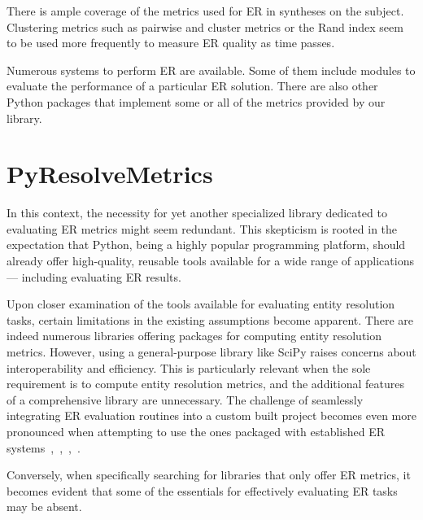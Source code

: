 \documentclass[a4paper,twoside]{article}
\begin{document}
    There is ample coverage of the metrics used for ER in syntheses on the
    subject\cite{vldb2010,hitesh2012,Tal11}.
    Clustering metrics such as pairwise and cluster metrics\cite{Men10, huang2006efficient}
    or the Rand index\cite{tal2007algebraic} seem to be used more frequently to
    measure ER quality as time passes.

    Numerous systems to perform ER are available.
    Some of them include modules to evaluate the performance of a
    particular ER solution\cite{fever2009,magellan2020,oyster2012}.
    There are also other Python packages that implement some or all of the
    metrics provided by our library\cite{nmeth2020scipy,ereval}.

    \section{PyResolveMetrics}\label{sec:library}

    In this context, the necessity for yet another specialized library dedicated
    to evaluating ER metrics might seem redundant.
    This skepticism is rooted in the expectation that Python, being a highly
    popular programming platform, should already offer high-quality, reusable
    tools available for a wide range of applications --- including evaluating
    ER results.
    
    Upon closer examination of the tools available for evaluating entity
    resolution tasks, certain limitations in the existing assumptions become
    apparent.
    There are indeed numerous libraries offering packages for computing entity
    resolution metrics.
    However, using a general-purpose library like SciPy raises concerns about
    interoperability and efficiency.
    This is particularly relevant when the sole requirement is to compute entity
    resolution metrics, and the additional features of a comprehensive library
    are unnecessary.
    The challenge of seamlessly integrating ER evaluation
    routines into a custom built project becomes even more pronounced when
    attempting to use the ones packaged with established ER
    systems~\cite{oyster2012},~\cite{jedai2017},~\cite{deepm2020},~\cite{magellan2020}.
    
    Conversely, when specifically searching for libraries that only offer ER
    metrics, it becomes evident that some of the essentials for effectively
    evaluating ER tasks may be absent\cite{ereval}.
\end{document}

